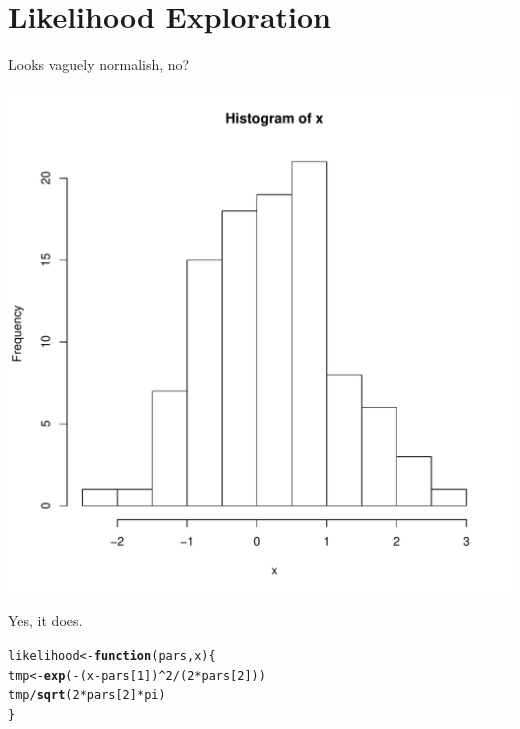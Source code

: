 \documentclass[letterpaper,12pt]{article}\usepackage[]{graphicx}\usepackage[]{color}
\makeatletter
\def\maxwidth{ %
  \ifdim\Gin@nat@width>\linewidth
    \linewidth
  \else
    \Gin@nat@width
  \fi
}
\newcommand{\hlnum}[1]{\textcolor[rgb]{0.686,0.059,0.569}{#1}}%
\newcommand{\hlopt}[1]{\textcolor[rgb]{0,0,0}{#1}}%
\newcommand{\hlstd}[1]{\textcolor[rgb]{0.345,0.345,0.345}{#1}}%
\newcommand{\hlkwa}[1]{\textcolor[rgb]{0.161,0.373,0.58}{\textbf{#1}}}%
\newcommand{\hlkwb}[1]{\textcolor[rgb]{0.69,0.353,0.396}{#1}}%
\newcommand{\hlkwc}[1]{\textcolor[rgb]{0.333,0.667,0.333}{#1}}%
\newcommand{\hlkwd}[1]{\textcolor[rgb]{0.737,0.353,0.396}{\textbf{#1}}}%
\newenvironment{kframe}{%
 \def\at@end@of@kframe{}%
 \ifinner\ifhmode%
  \def\at@end@of@kframe{\end{minipage}}%
  \begin{minipage}{\columnwidth}%
 \fi\fi%
 \def\FrameCommand##1{\hskip\@totalleftmargin \hskip-\fboxsep
 \colorbox{shadecolor}{##1}\hskip-\fboxsep
     \hskip-\linewidth \hskip-\@totalleftmargin \hskip\columnwidth}%
 \MakeFramed {\advance\hsize-\width
   \@totalleftmargin\z@ \linewidth\hsize
   \@setminipage}}%
 {\par\unskip\endMakeFramed%
 \at@end@of@kframe}
\newenvironment{knitrout}{}{} %
\numberwithin{equation}{section}
\makeatother
\begin{document}
\pagebreak
\section{Likelihood Exploration}
Looks vaguely normalish, no? 

\begin{knitrout}
\color{fgcolor}
\includegraphics[width=\maxwidth]{figure/unnamed-chunk-9-1} 

\end{knitrout}

Yes, it does.


\begin{knitrout}
\color{fgcolor}\begin{kframe}
\begin{alltt}
\hlstd{likelihood}\hlkwb{<-}\hlkwa{function}\hlstd{(}\hlkwc{pars}\hlstd{,}\hlkwc{x}\hlstd{) \{}
    \hlstd{tmp}\hlkwb{<-}\hlkwd{exp}\hlstd{(}\hlopt{-}\hlstd{(x}\hlopt{-}\hlstd{pars[}\hlnum{1}\hlstd{])}\hlopt{^}\hlnum{2}\hlopt{/}\hlstd{(}\hlnum{2}\hlopt{*}\hlstd{pars[}\hlnum{2}\hlstd{]))}
    \hlstd{tmp}\hlopt{/}\hlkwd{sqrt}\hlstd{(}\hlnum{2}\hlopt{*}\hlstd{pars[}\hlnum{2}\hlstd{]}\hlopt{*}\hlstd{pi)}
\hlstd{\}}
\end{alltt}
\end{kframe}
\end{knitrout}
\end{document}
